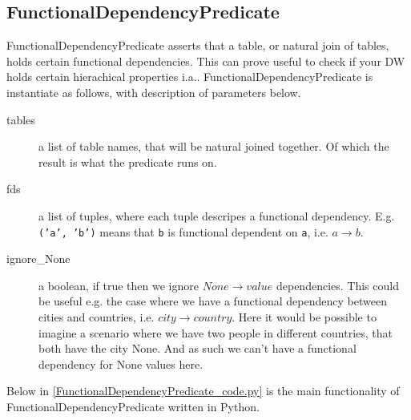 \subsection{FunctionalDependencyPredicate}
FunctionalDependencyPredicate asserts that a table, or natural join of tables, holds certain functional dependencies. This can prove useful to check if your DW holds certain hierachical properties i.a.. FunctionalDependencyPredicate is instantiate as follows, with description of parameters below.


\begin{description}
\item [tables] a list of table names, that will be natural joined together. Of which the result is what the predicate runs on.
\item [fds] a list of tuples, where each tuple descripes a functional dependency. E.g. \texttt{('a', 'b')} means that \texttt{b} is functional dependent on \texttt{a}, i.e. $a \rightarrow b$.
\item [ignore\_None] a boolean, if true then we ignore $None \rightarrow value$ dependencies. This could be useful e.g. the case where we have a functional dependency between cities and countries, i.e. $city \rightarrow country$. Here it would be possible to imagine a scenario where we have two people in different countries, that both have the city None. And as such we can't have a functional dependency for None values here.
  
\end{description}

Below in \cref{FunctionalDependencyPredicate_code.py} is the main functionality of FunctionalDependencyPredicate written in Python.


